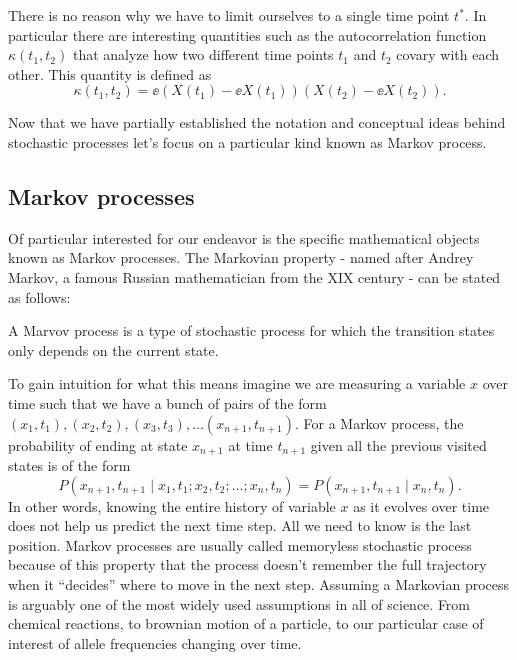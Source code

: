 There is no reason why we have to limit ourselves to a single time point $t^*$.
In particular there are interesting quantities such as the autocorrelation
function $\kappa(t_1, t_2)$ that analyze how two different time points $t_1$
and $t_2$ covary with each other. This quantity is defined as
\begin{equation}
  \kappa(t_1, t_2) = \ee{\left(X(t_1) - \ee{X(t_1)}\right)
                         \left(X(t_2) - \ee{X(t_2)}\right)}.
\end{equation}

Now that we have partially established the notation and conceptual ideas behind
stochastic processes let's focus on a particular kind known as Markov process.

\subsection{Markov processes}
Of particular interested for our endeavor is the specific mathematical objects
known as Markov processes. The Markovian property - named after Andrey Markov, a
famous Russian mathematician from the XIX century - can be stated as follows:
\begin{tcolorbox}
  A Marvov process is a type of stochastic process for which the transition
  states only depends on the current state.
\end{tcolorbox}
To gain intuition for what this means imagine we are measuring a variable $x$
over time such that we have a bunch of pairs of the form $(x_1, t_1), (x_2,
t_2), (x_3, t_3), \ldots (x_{n+1}, t_{n+1})$. For a Markov process, the
probability of ending at state $x_{n+1}$ at time $t_{n+1}$ given all the
previous visited states is of the form
\begin{equation}
  P(x_{n+1}, t_{n+1} \mid x_1, t_1; x_2, t_2; \ldots; x_n, t_n) =
  P(x_{n+1}, t_{n+1} \mid x_n, t_n).
  \label{eq_chapman_kolmogorov}
\end{equation}
In other words, knowing the entire history of variable $x$ as it evolves over
time does not help us predict the next time step. All we need to know is the
last position. Markov processes are usually called memoryless stochastic process
because of this property that the process doesn't remember the full trajectory
when it ``decides'' where to move in the next step. Assuming a Markovian process
is arguably one of the most widely used assumptions in all of science. From
chemical reactions, to brownian motion of a particle, to our particular case of
interest of allele frequencies changing over time.

